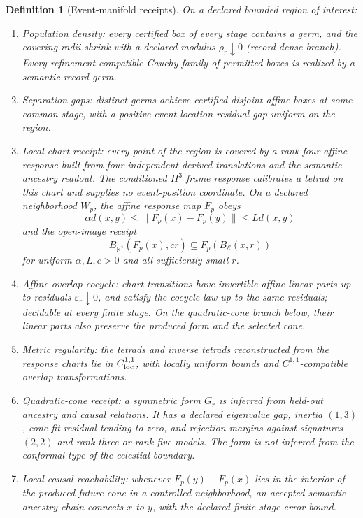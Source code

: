 \documentclass[11pt]{article}
\newtheorem{definition}[theorem]{Definition}
\begin{document}
\begin{definition}[Event-manifold receipts]
\label{def:event-manifold-receipts}
On a declared bounded region of interest:
\begin{enumerate}[leftmargin=2em]
\item[\(\mathsf{(E1)}\)] \emph{Population density}: every certified box of
every stage contains a germ, and the covering radii shrink with a declared
modulus \(\rho_r\downarrow0\) (record-dense branch). Every refinement-compatible
Cauchy family of permitted boxes is realized by a semantic record germ.
\item[\(\mathsf{(E2)}\)] \emph{Separation gaps}: distinct germs achieve
certified disjoint affine boxes at some common stage, with a positive
event-location residual gap uniform on the region.
\item[\(\mathsf{(E3)}\)] \emph{Local chart receipt}: every point of the region is
covered by a rank-four affine response built from four independent derived
translations and the semantic ancestry readout. The conditioned \(H^3\) frame
response calibrates a tetrad on this chart and supplies no event-position
coordinate. On a declared neighborhood \(W_p\), the affine response
map \(F_p\) obeys
\[
\alpha d(x,y)\leq\|F_p(x)-F_p(y)\|\leq Ld(x,y)
\]
and the open-image receipt
\[
B_{\mathbb R^4}(F_p(x),c r)
\subseteq F_p(B_{\mathcal E}(x,r))
\]
for uniform \(\alpha,L,c>0\) and all sufficiently small \(r\).
\item[\(\mathsf{(E4)}\)] \emph{Affine overlap cocycle}: chart transitions
have invertible affine linear parts up to residuals
\(\varepsilon_r\downarrow0\), and satisfy the cocycle law up to the same
residuals; decidable at every finite stage. On the quadratic-cone branch below,
their linear parts also preserve the produced form and the selected cone.
\item[\(\mathsf{(E4')}\)] \emph{Metric regularity}: the tetrads and inverse
tetrads reconstructed from the response charts lie in \(C^{1,1}_{\rm loc}\),
with locally uniform bounds and \(C^{1,1}\)-compatible overlap transformations.
\item[\(\mathsf{(E5)}\)] \emph{Quadratic-cone receipt}: a symmetric form
\(G_r\) is inferred from held-out ancestry and causal relations. It has a
declared eigenvalue gap, inertia \((1,3)\), cone-fit residual tending to zero,
and rejection margins against signatures \((2,2)\) and rank-three or rank-five
models. The form is not inferred from the conformal type of the celestial
boundary.
\item[\(\mathsf{(E6)}\)] \emph{Local causal reachability}: whenever
\(F_p(y)-F_p(x)\) lies in the interior of the produced future cone in a
controlled neighborhood, an accepted semantic ancestry chain connects
\(x\) to \(y\), with the declared finite-stage error bound.
\end{enumerate}
\end{definition}
\end{document}
